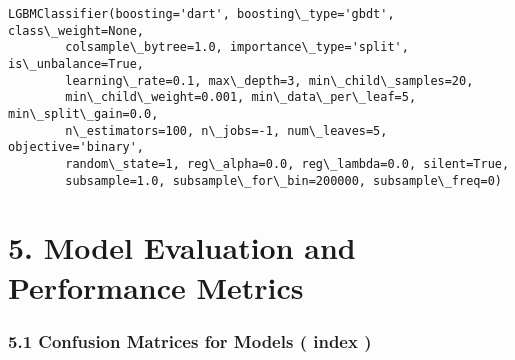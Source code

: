 \documentclass[11pt]{article}
\newcommand{\prompt}[4]{
        \llap{{\color{#2}[#3]: #4}}\vspace{-1.25em}
    }
\begin{document}
            \begin{tcolorbox}[breakable, boxrule=.5pt, size=fbox, pad at break*=1mm, opacityfill=0]
\prompt{Out}{outcolor}{31}{\hspace{3.5pt}}
\begin{Verbatim}[commandchars=\\\{\}]
LGBMClassifier(boosting='dart', boosting\_type='gbdt', class\_weight=None,
        colsample\_bytree=1.0, importance\_type='split', is\_unbalance=True,
        learning\_rate=0.1, max\_depth=3, min\_child\_samples=20,
        min\_child\_weight=0.001, min\_data\_per\_leaf=5, min\_split\_gain=0.0,
        n\_estimators=100, n\_jobs=-1, num\_leaves=5, objective='binary',
        random\_state=1, reg\_alpha=0.0, reg\_lambda=0.0, silent=True,
        subsample=1.0, subsample\_for\_bin=200000, subsample\_freq=0)
\end{Verbatim}
\end{tcolorbox}
        
    \section{\texorpdfstring{ 5. Model Evaluation and Performance Metrics
}{ 5. Model Evaluation and Performance Metrics  }}\label{model-evaluation-and-performance-metrics}

    \subsubsection{\texorpdfstring{ 5.1 Confusion Matrices for Models (
index
)}{ 5.1 Confusion Matrices for Models   ( index )}}\label{confusion-matrices-for-models-index}
\end{document}
